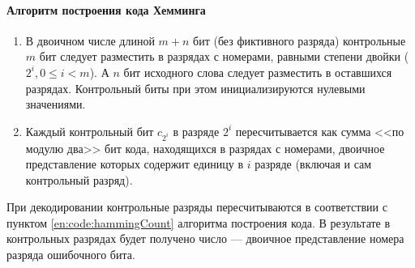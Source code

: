 \paragraph{Алгоритм построения кода Хемминга}
\begin{enumerate}
    \item В двоичном числе длиной $m+n$ бит (без фиктивного разряда) контрольные $m$ бит следует разместить в разрядах с номерами, равными степени двойки ($2^i,0\leq i<m$). А $n$ бит исходного слова следует разместить в оставшихся разрядах. Контрольный биты при этом инициализируются нулевыми значениями.
    
    \item\label{en:code:hammingCount} Каждый контрольный бит $c_{2^i}$ в разряде $2^i$ пересчитывается как сумма <<по модулю два>> бит кода, находящихся в разрядах с номерами, двоичное представление которых содержит единицу в $i$ разряде (включая и сам контрольный разряд).
\end{enumerate}

При декодировании контрольные разряды пересчитываются в соответствии с пунктом \ref{en:code:hammingCount} алгоритма построения кода. В результате в контрольных разрядах будет получено число --- двоичное представление номера разряда ошибочного бита.

